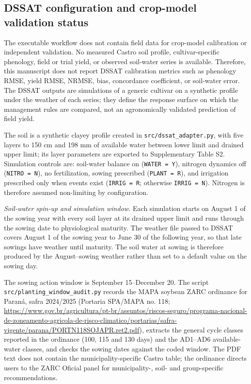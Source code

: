 \documentclass[times,final,authoryear]{elsarticle}
\begin{document}
\subsection{DSSAT configuration and crop-model validation status}
\label{subcropmodel}

The executable workflow does not contain field data for crop-model calibration or independent validation. No measured Castro soil profile, cultivar-specific phenology, field or trial yield, or observed soil-water series is available. Therefore, this manuscript does not report DSSAT calibration metrics such as phenology RMSE, yield RMSE, NRMSE, bias, concordance coefficient, or soil-water error. The DSSAT outputs are simulations of a generic cultivar on a synthetic profile under the weather of each series; they define the response surface on which the management rules are compared, not an agronomically validated prediction of field yield.

The soil is a synthetic clayey profile created in \texttt{src/dssat\_adapter.py}, with five layers to 150 cm and 198 mm of available water between lower limit and drained upper limit; its layer parameters are exported to Supplementary Table S2. Simulation controls are: soil-water balance on (\texttt{WATER = Y}), nitrogen dynamics off (\texttt{NITRO = N}), no fertilization, sowing prescribed (\texttt{PLANT = R}), and irrigation prescribed only when events exist (\texttt{IRRIG = R}; otherwise \texttt{IRRIG = N}). Nitrogen is therefore assumed non-limiting by configuration.

\emph{Soil-water spin-up and simulation window.} Each simulation starts on August 1 of the sowing year with every soil layer at its drained upper limit and runs through the sowing date to physiological maturity. The weather file passed to DSSAT covers August 1 of the sowing year to June 30 of the following year, so that late sowings have weather until maturity. The soil water at sowing is therefore produced by the August--sowing weather rather than set to a default value on the sowing day.

The sowing action window is September 15--December 20. The script \texttt{src/planting\_window\_audit.py} records the MAPA soybean ZARC ordinance for Paraná, safra 2024/2025 (Portaria SPA/MAPA no. 118; \url{https://www.gov.br/agricultura/pt-br/assuntos/riscos-seguro/programa-nacional-de-zoneamento-agricola-de-risco-climatico/portarias/safra-vigente/parana/PORTN118SOJAPR.ret2.pdf}), extracts the general cycle classes reported in the ordinance (100, 115 and 130 days) and the AD1--AD6 available-water classes, and checks the sowing dates against the coded window. The PDF text does not contain the municipality-specific Castro table; the ordinance directs users to the ZARC Oficial panel for municipality-, soil- and group-specific recommendations.
\end{document}
